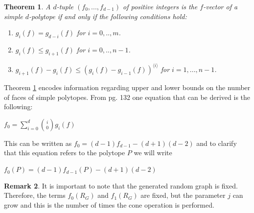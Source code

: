 \documentclass[oneside,12pt]{amsart}
\newtheorem{Theorem}{Theorem}[section]
\theoremstyle{definition}
\newtheorem{Remark}[Theorem]{Remark}
\numberwithin{equation}{section}
\begin{document}
\begin{Theorem}\label{MM condition}
A $d$-tuple $(f_0,...,f_{d-1})$ of positive integers is the $f$-vector of a simple $d$-polytope if and only if the following conditions hold:

\begin{center}
\begin{enumerate}
  \item $g_i(f) = g_{d-i}(f)$ for $i = 0,..,m$.
  \vspace{.1in}
  \item $g_i(f) \leq g_{i+1}(f)$ for $i = 0,..,n-1$.
  \vspace{.1in}
  \item $g_{i+1}(f) - g_{i}(f) \leq (g_i(f) - g_{i-1}(f))^{\langle i\rangle}$ for $i = 1,...,n-1$.
\end{enumerate}
\end{center}

\end{Theorem}

Theorem \ref{MM condition} encodes information regarding upper and lower bounds on the number of faces of simple polytopes.  From \cite{B} pg. 132 one equation that can be derived is the following:

\begin{center}
$ f_0 = \sum_{i=0}^d \binom{i}{0}g_i(f)$
\end{center}

\vspace{.1in}
This can be written as $f_0 = (d-1)f_{d-1} - (d+1)(d-2)$ and to clarify that this equation refers to the polytope $P$ we will write

\begin{center}
$f_0(P) = (d-1)f_{d-1}(P) - (d+1)(d-2)$
\end{center}







\begin{Remark}
It is important to note that the generated random graph is fixed.  Therefore, the terms $f_0(R_G)$ and $f_1(R_G)$ are fixed, but the parameter $j$ can grow and this is the number of times the cone operation is performed.
\end{Remark}
\end{document}
